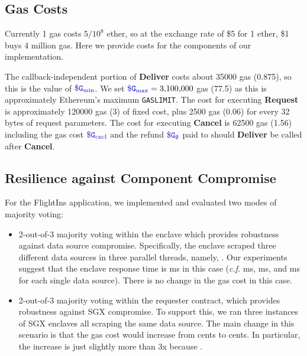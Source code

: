 \subsection{Gas Costs}
Currently 1 gas costs $5 / 10^8$ ether, so at the exchange rate of \$5 for 1 ether, \$1 buys 4 million gas.
Here we provide costs for the components of our implementation.

The callback-independent portion of {\bf Deliver} costs about \num[group-separator={,}]{35000} gas (0.875\textcent), so this is the value of $\constgasmin$.
We set $\constgasmax = \num[group-separator={,}]{3100000}$ gas (77.5\textcent) as this is approximately Ethereum's maximum {\tt GASLIMIT}.
The cost for executing {\bf Request} is approximately \num[group-separator={,}]{120000} gas (3\textcent) of fixed cost, 
plus \num[group-separator={,}]{2500} gas (0.06\textcent) for every 32 bytes of request parameters.
The cost for executing {\bf Cancel} is 62500 gas (1.56\textcent)
including the gas cost $\constgasinvokecancel$ and the refund $\constgascancel$ paid to \tcs should {\bf Deliver} be called after {\bf Cancel}.




\subsection{Resilience against Component Compromise}
For the {\sf FlightIns} application, 
we implemented and evaluated two modes of majority voting:
\begin{itemize}[leftmargin=3mm]
\item
2-out-of-3 majority voting within the enclave which provides robustness
against data source compromise.
Specifically, the enclave scraped three different data sources in three parallel threads, 
namely, .
Our experiments suggest that  
the enclave response time is 
 ms in this case ({\it c.f.}  ms, 
 ms, and  ms for 
each single data source).
There is no change in the gas cost in this case.
\item
2-out-of-3 majority voting within the requester contract,
which provides robustness against 
SGX compromise.
To support this, we ran three instances of SGX enclaves all scraping
the same data source.  
The main change in this scenario is that 
the gas cost would increase from
 cents 
to  cents.
In particular, the increase is just slightly more than 3x 
because .
\end{itemize}


